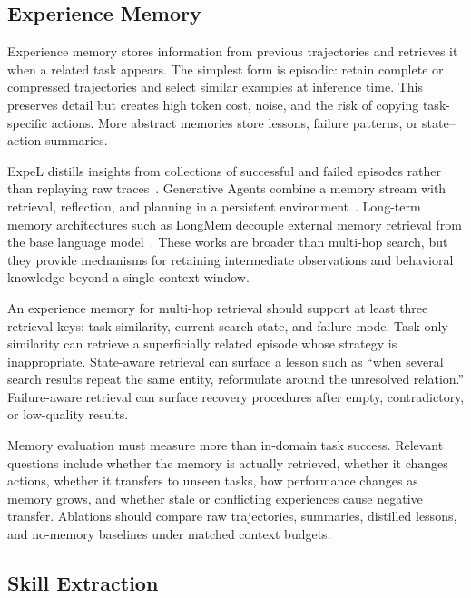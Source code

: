 \subsection{Experience Memory}
\label{subsec:experience_memory}

Experience memory stores information from previous trajectories and retrieves it when a related task appears. The simplest form is episodic: retain complete or compressed trajectories and select similar examples at inference time. This preserves detail but creates high token cost, noise, and the risk of copying task-specific actions. More abstract memories store lessons, failure patterns, or state--action summaries.

ExpeL distills insights from collections of successful and failed episodes rather than replaying raw traces~\cite{zhao2024expel}. Generative Agents combine a memory stream with retrieval, reflection, and planning in a persistent environment~\cite{park2023generativeagents}. Long-term memory architectures such as LongMem decouple external memory retrieval from the base language model~\cite{wang2023longmem}. These works are broader than multi-hop search, but they provide mechanisms for retaining intermediate observations and behavioral knowledge beyond a single context window.

An experience memory for multi-hop retrieval should support at least three retrieval keys: task similarity, current search state, and failure mode. Task-only similarity can retrieve a superficially related episode whose strategy is inappropriate. State-aware retrieval can surface a lesson such as ``when several search results repeat the same entity, reformulate around the unresolved relation.'' Failure-aware retrieval can surface recovery procedures after empty, contradictory, or low-quality results.

Memory evaluation must measure more than in-domain task success. Relevant questions include whether the memory is actually retrieved, whether it changes actions, whether it transfers to unseen tasks, how performance changes as memory grows, and whether stale or conflicting experiences cause negative transfer. Ablations should compare raw trajectories, summaries, distilled lessons, and no-memory baselines under matched context budgets.

\subsection{Skill Extraction}
\label{subsec:skill_extraction}

